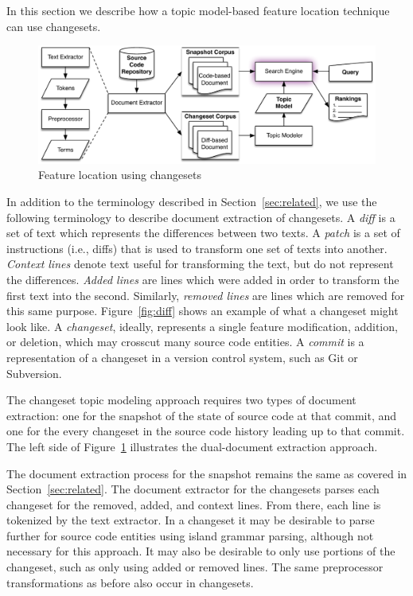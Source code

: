 
In this section we describe how a topic model-based feature location
technique can use changesets.



\begin{figure}
\vspace{2mm}
\centerline{\includegraphics[width=.75\textwidth]{figures/changeset-flt}}
\caption{Feature location using changesets}
\label{fig:changeset}
\vspace{-2mm}
\end{figure}

In addition to the terminology described in Section~\ref{sec:related},
we use the following terminology to describe document extraction of changesets.
A \textit{diff} is a set of text which represents the differences between two texts.
A \textit{patch} is a set of instructions (i.e., diffs) that is used to transform one set of texts into another.
\textit{Context lines} denote text useful for transforming the text, but do not represent the differences.
\textit{Added lines} are lines which were added in order to transform the first text into the second.
Similarly, \textit{removed lines} are lines which are removed for this same purpose.
Figure~\ref{fig:diff} shows an example of what a changeset might look like.
A \textit{changeset}, ideally, represents a single feature modification,
addition, or deletion, which may crosscut many source code entities.
A \textit{commit} is a representation of a changeset in a version control system, such as Git or Subversion.

The changeset topic modeling approach requires two types of document extraction:
one for the snapshot of the state of source code at that commit,
and one for the every changeset in the source code history leading up to that commit.
The left side of Figure~\ref{fig:changeset} illustrates the dual-document extraction approach.

The document extraction process for the snapshot remains the same as covered in Section~\ref{sec:related}.
The document extractor for the changesets parses each changeset for the removed, added, and context lines.
From there, each line is tokenized by the text extractor.
In a changeset it may be desirable to parse further for source code entities using island grammar parsing\needcite,
although not necessary for this approach.
It may also be desirable to only use portions of the changeset, such as only using added or removed lines.
The same preprocessor transformations as before also occur in changesets.

